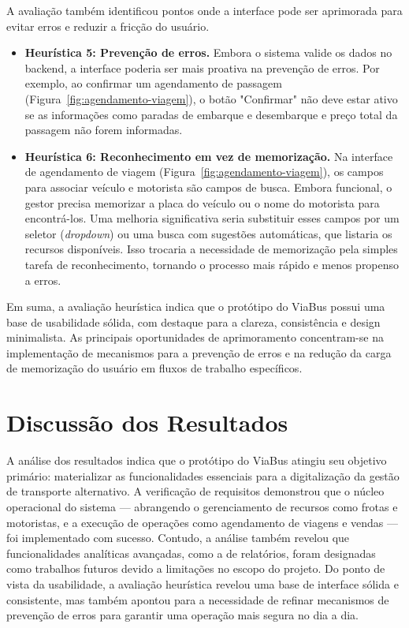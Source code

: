 A avaliação também identificou pontos onde a interface pode ser aprimorada para evitar erros e reduzir a fricção do usuário.

\begin{itemize}
  \item \textbf{Heurística 5: Prevenção de erros.} Embora o sistema valide os dados no backend, a interface poderia ser mais proativa na prevenção de erros. Por exemplo, ao confirmar um agendamento de passagem (Figura~\ref{fig:agendamento-viagem}), o botão "Confirmar" não deve estar ativo se as informações como paradas de embarque e desembarque e preço total da passagem não forem informadas.

  \item \textbf{Heurística 6: Reconhecimento em vez de memorização.} Na interface de agendamento de viagem (Figura~\ref{fig:agendamento-viagem}), os campos para associar veículo e motorista são campos de busca. Embora funcional, o gestor precisa memorizar a placa do veículo ou o nome do motorista para encontrá-los. Uma melhoria significativa seria substituir esses campos por um seletor (\textit{dropdown}) ou uma busca com sugestões automáticas, que listaria os recursos disponíveis. Isso trocaria a necessidade de memorização pela simples tarefa de reconhecimento, tornando o processo mais rápido e menos propenso a erros.
\end{itemize}

Em suma, a avaliação heurística indica que o protótipo do ViaBus possui uma base de usabilidade sólida, com destaque para a clareza, consistência e design minimalista. As principais oportunidades de aprimoramento concentram-se na implementação de mecanismos para a prevenção de erros e na redução da carga de memorização do usuário em fluxos de trabalho específicos.
\section{Discussão dos Resultados}

A análise dos resultados indica que o protótipo do ViaBus atingiu seu objetivo primário: materializar as funcionalidades essenciais para a digitalização da gestão de transporte alternativo. A verificação de requisitos demonstrou que o núcleo operacional do sistema — abrangendo o gerenciamento de recursos como frotas e motoristas, e a execução de operações como agendamento de viagens e vendas — foi implementado com sucesso. Contudo, a análise também revelou que funcionalidades analíticas avançadas, como a de relatórios, foram designadas como trabalhos futuros devido a limitações no escopo do projeto. Do ponto de vista da usabilidade, a avaliação heurística revelou uma base de interface sólida e consistente, mas também apontou para a necessidade de refinar mecanismos de prevenção de erros para garantir uma operação mais segura no dia a dia.

